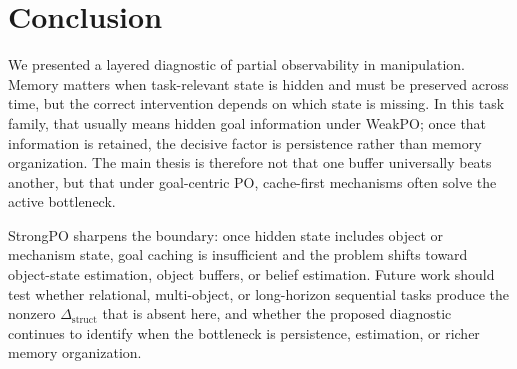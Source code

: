 \section{Conclusion}
\label{sec:conclusion}

We presented a layered diagnostic of partial observability in manipulation. Memory matters when task-relevant state is hidden and must be preserved across time, but the correct intervention depends on which state is missing. In this task family, that usually means hidden goal information under WeakPO; once that information is retained, the decisive factor is persistence rather than memory organization. The main thesis is therefore not that one buffer universally beats another, but that under goal-centric PO, cache-first mechanisms often solve the active bottleneck.

StrongPO sharpens the boundary: once hidden state includes object or mechanism state, goal caching is insufficient and the problem shifts toward object-state estimation, object buffers, or belief estimation. Future work should test whether relational, multi-object, or long-horizon sequential tasks produce the nonzero $\Delta_{\text{struct}}$ that is absent here, and whether the proposed diagnostic continues to identify when the bottleneck is persistence, estimation, or richer memory organization.
